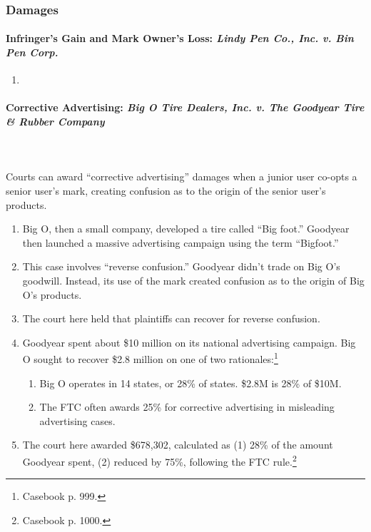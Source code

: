 \subsubsection{Damages}

\paragraph{Infringer's Gain and Mark Owner's Loss: \emph{Lindy Pen Co., Inc. 
v. Bin Pen Corp.}}

\begin{enumerate}
    \item %
\end{enumerate}

\paragraph{Corrective Advertising: \emph{Big O Tire Dealers, Inc. v. The 
Goodyear Tire \& Rubber Company}}
~\\\\
Courts can award ``corrective advertising'' damages when a junior user co-opts 
a senior user's mark, creating confusion as to the origin of the senior user's 
products.

\begin{enumerate}
    \item Big O, then a small company, developed a tire called ``Big foot.'' 
    Goodyear then launched a massive advertising campaign using the term 
    ``Bigfoot.''
    \item This case involves ``reverse confusion.'' Goodyear didn't trade on 
    Big O's goodwill. Instead, its use of the mark created confusion as to the 
    origin of Big O's products.
    \item The court here held that plaintiffs can recover for reverse 
    confusion.
    \item Goodyear spent about \$10 million on its national advertising 
    campaign. Big O sought to recover \$2.8 million on one of two 
    rationales:\footnote{Casebook p. 999.}
    \begin{enumerate}
        \item Big O operates in 14 states, or 28\% of states. \$2.8M is 28\% 
        of \$10M.
        \item The FTC often awards 25\% for corrective advertising in 
        misleading advertising cases.
    \end{enumerate}
    \item The court here awarded \$678,302, calculated as (1) 28\% of the 
    amount Goodyear spent, (2) reduced by 75\%, following the FTC 
    rule.\footnote{Casebook p. 1000.}
\end{enumerate}
